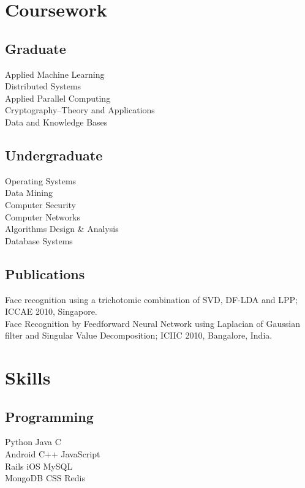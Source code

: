 \documentclass[]{deedy-resume-openfont}
\begin{document}
\begin{minipage}[t]{0.35\textwidth}

\section{Coursework}
\subsection{Graduate}
Applied Machine Learning \\
Distributed Systems \\
Applied Parallel Computing \\
Cryptography–Theory and Applications \\
Data and Knowledge Bases \\
\sectionsep

\subsection{Undergraduate}
Operating Systems \\
Data Mining \\
Computer Security\\
Computer Networks\\
Algorithms Design \& Analysis\\
Database Systems\\
\sectionsep

\subsection{Publications}
{\fontsize{9}{11}\selectfont
Face
recognition
using
a
trichotomic
combination
of
SVD,
DF-LDA
and
LPP;
ICCAE
2010,
Singapore. \\
Face
Recognition
by
Feedforward
Neural
Network
using
Laplacian
of
Gaussian
filter
and
Singular
Value
Decomposition;
ICIIC
2010,
Bangalore,
India.
}
\sectionsep


\section{Skills}
\subsection{Programming}

\textbullet{} Python
\textbullet{} Java     \textbullet{} C \\
\textbullet{} Android \textbullet{} C++ \textbullet{} JavaScript \\
\textbullet{}Rails \textbullet{} iOS  \textbullet{} MySQL \\ \textbullet{} MongoDB\textbullet{} CSS \textbullet{}Redis
\sectionsep


%
%

\end{minipage} 
\end{document}
